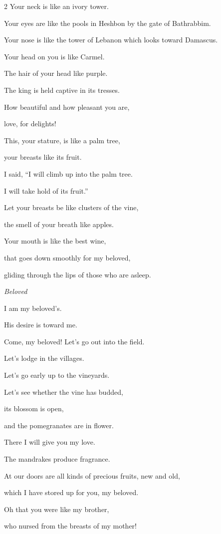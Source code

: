 \begin{multicols}{2}
\myverse{}Your neck is like an ivory tower.

Your eyes are like the pools in Heshbon by the gate of Bathrabbim.

Your nose is like the tower of Lebanon which looks toward Damascus.

\myverse{}Your head on you is like Carmel.

The hair of your head like purple.

The king is held captive in its tresses.

\myverse{}How beautiful and how pleasant you are,

love, for delights!

\myverse{}This, your stature, is like a palm tree,

your breasts like its fruit.

\myverse{}I said, “I will climb up into the palm tree.

I will take hold of its fruit.”

Let your breasts be like clusters of the vine,

the smell of your breath like apples.

\myverse{}Your mouth is like the best wine,

that goes down smoothly for my beloved,

gliding through the lips of those who are asleep.


\textit{Beloved}

\myverse{}I am my beloved’s.

His desire is toward me.

\myverse{}Come, my beloved! Let’s go out into the field.

Let’s lodge in the villages.

\myverse{}Let’s go early up to the vineyards.

Let’s see whether the vine has budded,

its blossom is open,

and the pomegranates are in flower.

There I will give you my love.

\myverse{}The mandrakes produce fragrance.

At our doors are all kinds of precious fruits, new and old,

which I have stored up for you, my beloved.

\mychapter{} \myverse*{}Oh that you were like my brother,

who nursed from the breasts of my mother!


\end{multicols}

